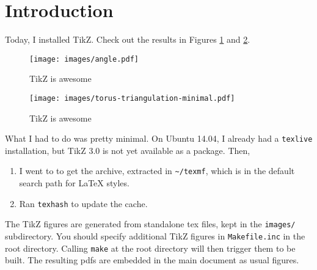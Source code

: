 \documentclass[12pt]{article}
\begin{document}
\maketitle
\section{Introduction}
Today, I installed TikZ. Check out the results in Figures
\ref{fig:angle} and \ref{fig:torus-triangulation-minimal}.

\begin{figure}[h!]
    \centering
    \texttt{[image: images/angle.pdf]}
    \caption{TikZ is awesome}
    \label{fig:angle}
\end{figure}

\begin{figure}[h!]
    \centering
    \texttt{[image: images/torus-triangulation-minimal.pdf]}
    \caption{TikZ is awesome}
    \label{fig:torus-triangulation-minimal}
\end{figure}

What I had to do was pretty minimal. On Ubuntu 14.04, I already had a
\texttt{texlive} installation, but TikZ 3.0 is not yet available as a package.
Then,

\begin{enumerate}
\item I went to \cite{url:pgf} to get the archive, extracted in
\texttt{\textasciitilde/texmf}, which is in the default search path for \LaTeX
styles.
\item Ran \texttt{texhash} to update the cache.
\end{enumerate}

The TikZ figures are generated from standalone tex files, kept in the
\texttt{images/} subdirectory. You should specify additional TikZ figures in
\texttt{Makefile.inc} in the root directory. Calling \texttt{make} at the root
directory will then trigger them to be built. The resulting pdfs are embedded
in the main document as usual figures.

\label{sec:ref}


\end{document}
